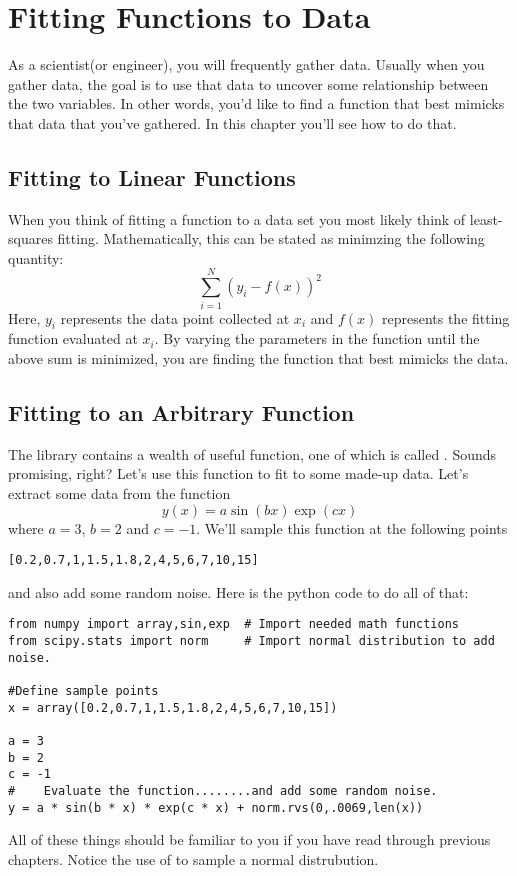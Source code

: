 \chapter{Fitting Functions to Data}
\label{chap:Fitting}

As a scientist(or engineer), you will frequently gather data.  Usually
when you gather data, the goal is to use that data to uncover some
relationship between the two variables.  In other words, you'd like to
find a function that best mimicks that data that you've gathered.  In
this chapter you'll see how to do that.

\section{Fitting to Linear Functions}
When you think of fitting a function to a data set you most likely
think of least-squares fitting.  Mathematically, this can be stated
as minimzing the following quantity:
\begin{equation}
\sum_{i=1}^N (y_i - f(x))^2
\end{equation}
Here, $y_i$ represents the data point collected at $x_i$ and $f(x)$ represents
the fitting function evaluated at $x_i$.  By varying the parameters in
the function until the above sum is minimized, you are finding the
function that best mimicks the data.

\section{Fitting to an Arbitrary Function}
The  library contains a wealth of useful function, one
of which is called .  Sounds promising, right?
Let's use this function to fit to some made-up data.  Let's extract
some data from the function
\begin{equation}
y(x)  = a \sin(b x) \exp(c x)
\end{equation}
where $a = 3$, $b=2$ and $c= -1$.  We'll sample this function at the
following points
\begin{Verbatim}
[0.2,0.7,1,1.5,1.8,2,4,5,6,7,10,15]
\end{Verbatim}
and also add some random noise.  Here is the python code to do all of
that:
\begin{Verbatim}
from numpy import array,sin,exp  # Import needed math functions
from scipy.stats import norm     # Import normal distribution to add noise.

#Define sample points
x = array([0.2,0.7,1,1.5,1.8,2,4,5,6,7,10,15])

a = 3
b = 2
c = -1
#    Evaluate the function........and add some random noise.
y = a * sin(b * x) * exp(c * x) + norm.rvs(0,.0069,len(x))
\end{Verbatim}
All of these things should be familiar to you if you have read through
previous chapters.  Notice the use of  to sample a
normal distrubution.


